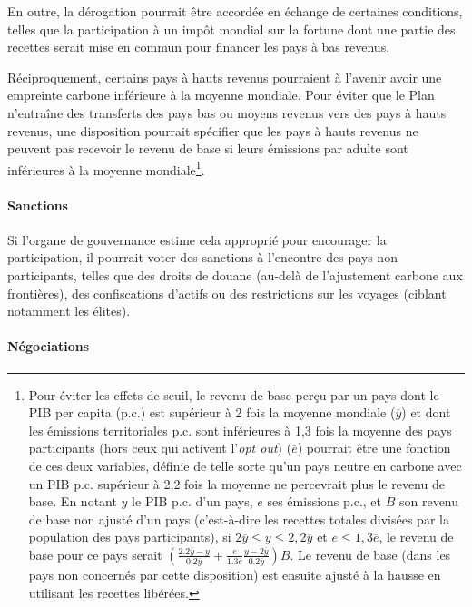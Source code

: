\documentclass[a5paper,french]{memoir}
\begin{document}
En outre, la dérogation pourrait être accordée en échange de certaines conditions, telles que la participation à un impôt mondial sur la fortune dont une partie des recettes serait mise en commun pour financer les pays à bas revenus.

Réciproquement, certains pays à hauts revenus pourraient à l'avenir avoir une empreinte carbone inférieure à la moyenne mondiale. %
Pour éviter que le Plan n'entraîne des transferts des pays bas ou moyens revenus vers des pays à hauts revenus, une disposition pourrait spécifier que les pays à hauts revenus ne peuvent pas recevoir le revenu de base si leurs émissions par adulte sont inférieures à la moyenne mondiale\footnote{Pour éviter les effets de seuil, le revenu de base perçu par un pays dont le PIB per capita (p.c.) est supérieur à 2 fois la moyenne mondiale ($\overline{y}$) et dont les émissions territoriales p.c. sont inférieures à 1,3 fois la moyenne des pays participants (hors ceux qui activent l'\textit{opt out}) ($\overline{e}$) pourrait être une fonction de ces deux variables, définie de telle sorte qu'un pays neutre en carbone avec un PIB p.c. supérieur à 2,2 fois la moyenne ne percevrait plus le revenu de base. En notant $y$ le PIB p.c. d'un pays, $e$ ses émissions p.c., et $B$ son revenu de base non ajusté d'un pays (c'est-à-dire les recettes totales divisées par la population des pays participants), si $2\overline{y}\leq y\leq 2,2\overline{y}$ et $e \leq 1,3 \overline{e}$, le revenu de base pour ce pays serait $\left( \frac{2.2\overline{y}-y}{0.2\overline{y}} + \frac{e}{1.3\overline{e}} \frac{y-2\overline{y}}{0.2\overline{y}} \right) B$. Le revenu de base (dans les pays non concernés par cette disposition) est ensuite ajusté à la hausse en utilisant les recettes libérées.}. 

\paragraph{Sanctions}

Si l'organe de gouvernance estime cela approprié pour encourager la participation, il pourrait voter des sanctions à l'encontre des pays non participants, telles que des droits de douane (au-delà de l'ajustement carbone aux frontières), des confiscations d'actifs ou des restrictions sur les voyages (ciblant notamment les élites).

\paragraph{Négociations}
\end{document}
